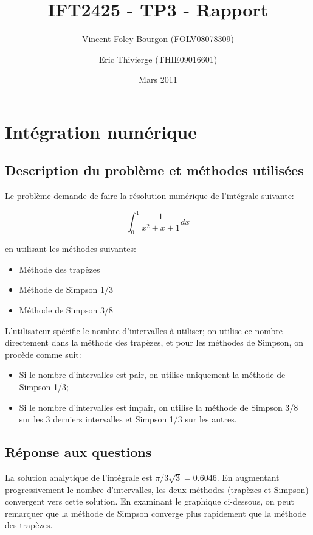 \documentclass[10pt]{article}
\begin{document}
\title{IFT2425 - TP3 - Rapport}
\date{Mars 2011}
\author{Vincent Foley-Bourgon (FOLV08078309) \and
  Eric Thivierge (THIE09016601)}

\maketitle

\section{Intégration numérique}

\subsection{Description du problème et méthodes utilisées}

Le problème demande de faire la résolution numérique de l'intégrale
suivante:

\[
\int_0^1 \frac{1}{x^2 + x + 1}dx
\]

en utilisant les méthodes suivantes:

\begin{itemize}
\item Méthode des trapèzes
\item Méthode de Simpson 1/3
\item Méthode de Simpson 3/8
\end{itemize}

L'utilisateur spécifie le nombre d'intervalles à utiliser; on utilise
ce nombre directement dans la méthode des trapèzes, et pour les
méthodes de Simpson, on procède comme suit:

\begin{itemize}
\item Si le nombre d'intervalles est pair, on utilise uniquement la
  méthode de Simpson 1/3;
\item Si le nombre d'intervalles est impair, on utilise la méthode de
  Simpson 3/8 sur les 3 derniers intervalles et Simpson 1/3 sur les autres.
\end{itemize}

\subsection{Réponse aux questions}

La solution analytique de l'intégrale est $\pi/3\sqrt{3} = 0.6046$.  En
augmentant progressivement le nombre d'intervalles, les deux méthodes
(trapèzes et Simpson) convergent vers cette solution.  En examinant le
graphique ci-dessous, on peut remarquer que la méthode de Simpson
converge plus rapidement que la méthode des trapèzes.
\end{document}
